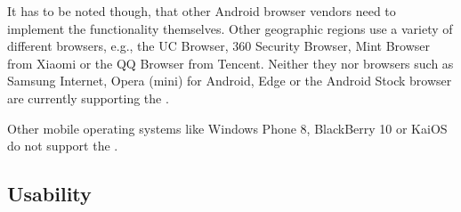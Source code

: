 \newpage

It has to be noted though, that other Android browser vendors need to implement the functionality themselves. Other geographic regions use a variety of different browsers, e.g., the UC Browser, 360 Security Browser, Mint Browser from Xiaomi or the QQ Browser from Tencent. Neither they nor browsers such as Samsung Internet, Opera (mini) for Android, Edge or the Android Stock browser are currently supporting the \wa.

Other mobile operating systems like Windows Phone 8, BlackBerry 10 or KaiOS do not support the \wa.

\subsection{Usability}























